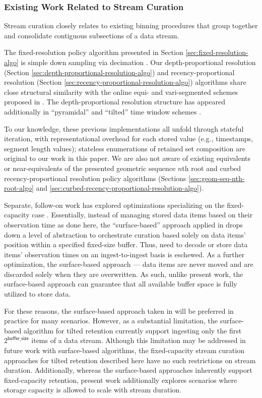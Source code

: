 \subsubsection{Existing Work Related to Stream Curation}

Stream curation closely relates to existing binning procedures that group together and consolidate contiguous subsections of a data stream.

The fixed-resolution policy algorithm presented in Section \ref{sec:fixed-resolution-algo} is simple down sampling via decimation \citep[p. 31]{crochiere1983multirate}.
Our depth-proportional resolution (Section \ref{sec:depth-proportional-resolution-algo}) and recency-proportional resolution (Section \ref{sec:recency-proportional-resolution-algo}) algorithms share close structural similarity with the online equi- and vari-segmented schemes proposed in
\citep{zhao2005generalized}.
The depth-proportional resolution structure has appeared additionally in ``pyramidal'' and ``tilted'' time window schemes \citep{aggarwal2003framework,han2005stream}.

To our knowledge, these previous implementations all unfold through stateful iteration, with representational overhead for each stored value (e.g., timestamps, segment length values); stateless enumerations of retained set composition are original to our work in this paper.
We are also not aware of existing equivalents or near-equivalents of the presented geometric sequence $n$th root and curbed recency-proportional resolution policy algorithms (Sections \ref{sec:geom-seq-nth-root-algo} and \ref{sec:curbed-recency-proportional-resolution-algo}).

Separate, follow-on work has explored optimizations specializing on the fixed-capacity case \citep{moreno2024structured}.
Essentially, instead of managing stored data items based on their observation time as done here, the ``surface-based'' approach applied in \citep{moreno2024structured} drops down a level of abstraction to orchestrate curation based solely on data items' position within a specified fixed-size buffer.
Thus, need to decode or store data items' observation times on an ingest-to-ingest basis is eschewed.
As a further optimization, the surface-based approach --- data items are never moved and are discarded solely when they are overwritten.
As such, unlike present work, the surface-based approach can guarantee that all available buffer space is fully utilized to store data.

For these reasons, the surface-based approach taken in \citet{moreno2024algorithms} will be preferred in practice for many scenarios.
However, as a substantial limitation, the surface-based algorithm for tilted retention currently support ingesting only the first $2^\mathsf{buffer\_size}$ items of a data stream.
Although this limitation may be addressed in future work with surface-based algorithms, the fixed-capacity stream curation approaches for tilted retention described here have no such restrictions on stream duration.
Additionally, whereas the surface-based approaches inherently support fixed-capacity retention, present work additionally explores scenarios where storage capacity is allowed to scale with stream duration.

